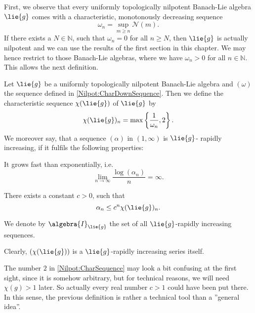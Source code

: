 First, we observe that every uniformly topologically nilpotent Banach-Lie 
algebra $\lie{g}$ comes with a characteristic, monotonously decreasing sequence
\begin{equation}
	\label{Nilpot:CharDownSequence}
	\omega_n
	=
	\sup_{m \geq n} \mathcal{N}(m).	
\end{equation}
If there exists a $N \in \mathbb{N}$, such that $\omega_n = 0$ for all $n \geq 
N$, then $\lie{g}$ is actually nilpotent and we can use the results of the 
first section in this chapter. We may hence restrict to those Banach-Lie 
algebras, where we have $\omega_n > 0$ for all $n \in \mathbb{N}$. This allows 
the next definition.
\begin{definition}
	Let $\lie{g}$ be a uniformly topologically nilpotent Banach-Lie algebra and 
	$(\omega)$ the sequence defined in \eqref{Nilpot:CharDownSequence}. Then we 
	define the characteristic sequence $\chi(\lie{g})$ of $\lie{g}$ by
	\begin{equation}
		\label{Nilpot:CharSequence}
		\chi(\lie{g})_n
		=
		\max
		\left\{ 
			\frac{1}{\omega_n}
			,
			2
		\right\}.
	\end{equation}
	We moreover say, that a sequence $(\alpha)$ in $(1, \infty)$ is $\lie{g}$-
	rapidly increasing, if it fulfils the following properties:
	\begin{definitionlist}
		\item
		It grows fast than exponentially, i.e.
		\begin{equation*}
			\lim_{n \longrightarrow \infty}
			\frac{\log \left(\alpha_n \right)}{n}
			=
			\infty.
		\end{equation*}
		
		\item
		There exists a constant $c > 0$, such that
		\begin{equation*}
			\alpha_n 
			\leq 
			c^n  \chi(\lie{g})_n.
		\end{equation*}
	\end{definitionlist}
	We denote by $\algebra{I}_{\lie{g}}$ the set of all $\lie{g}$-rapidly 
	increasing sequences.
\end{definition}
Clearly, $(\chi(\lie{g}))$ is a $\lie{g}$-rapidly increasing series itself.
\begin{remark}
	The number $2$ in \eqref{Nilpot:CharSequence} may look a bit confusing at 
	the first sight, since it is somehow arbitrary, but for technical reasons, 
	we will need $\chi(g) > 1$ later. So actually every real number $c > 1$ 
	could have been put there. In this sense, the previous definition is rather 
	a technical tool than a ''general idea''.
\end{remark}
